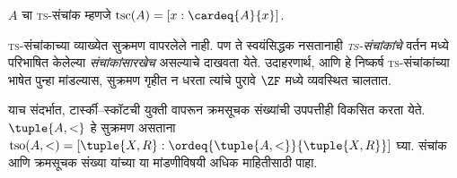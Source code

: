 \documentclass[../../../include/open-logic-section]{subfiles}
\begin{document}
\begin{defn}
$A$ चा \textsc{ts}-संचांक म्हणजे $\text{tsc}(A) = [x :
\cardeq{A}{x}]$.
\end{defn}

\textsc{ts}-संचांकाच्या व्याख्येत सुक्रमण वापरलेले नाही. पण ते स्वयंसिद्धक नसतानाही \emph{\textsc{ts}-संचांकांचे} वर्तन  मध्ये परिभाषित केलेल्या \emph{संचांकांसारखेच} असल्याचे दाखवता येते. उदाहरणार्थ,  आणि  हे निष्कर्ष \textsc{ts}-संचांकांच्या भाषेत पुन्हा मांडल्यास, सुक्रमण गृहीत न धरता त्यांचे पुरावे $\ZF$ मध्ये व्यवस्थित चालतात.

याच संदर्भात, टार्स्की--स्कॉटची युक्ती वापरून क्रमसूचक संख्यांची उपपत्तीही विकसित करता येते. $\tuple{A, <}$ हे सुक्रमण असताना $\text{tso}(A, <) = [\tuple{X,
R} : \ordeq{\tuple{A, <}}{\tuple{X, R}}]$ घ्या. संचांक आणि क्रमसूचक संख्या यांच्या या मांडणीविषयी अधिक माहितीसाठी \citet[प्रकरणे~9--12]{Potter2004} पाहा.
\end{document}
